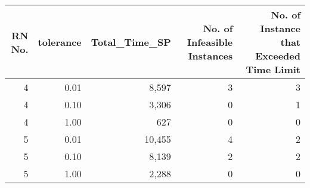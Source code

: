 \begin{tabular}{rrrrr}
\toprule
 RN No. &  tolerance & Total_Time_SP & No. of Infeasible Instances & No. of Instance that Exceeded Time Limit \\
\midrule
      4 &       0.01 &         8,597 &                           3 &                                        3 \\
      4 &       0.10 &         3,306 &                           0 &                                        1 \\
      4 &       1.00 &           627 &                           0 &                                        0 \\
      5 &       0.01 &        10,455 &                           4 &                                        2 \\
      5 &       0.10 &         8,139 &                           2 &                                        2 \\
      5 &       1.00 &         2,288 &                           0 &                                        0 \\
\bottomrule
\end{tabular}
